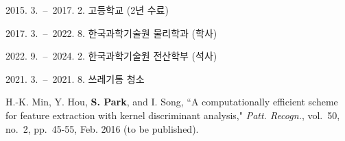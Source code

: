 \documentclass[master,english,final]{kaist-ucs} %
\begin{document}
\begin{education}
	\item[2015. 3.\ --\ 2017. 2.] 고등학교 (2년 수료)
	\item[2017. 3.\ --\ 2022. 8.] 한국과학기술원 물리학과 (학사)
	\item[2022. 9.\ --\ 2024. 2.] 한국과학기술원 전산학부 (석사)
\end{education}

\begin{career}
	\item[2021. 3.\ --\ 2021. 8.] 쓰레기통 청소
\end{career}


\begin{publication}
	\item H.-K. Min, Y. Hou, {\bf S. Park}, and I. Song, ``A computationally efficient
	scheme for feature extraction with kernel discriminant analysis," \textit{Patt.
		Recogn.}, vol.~50, no.~2, pp.~45-55, Feb. 2016 (to be published).
\end{publication}

\label{paperlastpagelabel}     %
\end{document}
